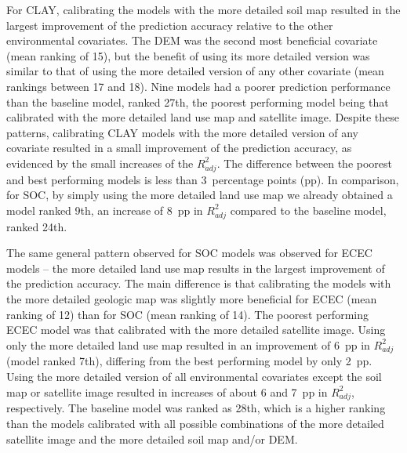 For CLAY, calibrating the models with the more detailed soil map resulted in the largest improvement of the 
prediction accuracy relative to the other environmental covariates. The DEM was the second most beneficial 
covariate (mean ranking of 15), but the benefit of using its more detailed version was similar to that of using 
the more detailed version of any other covariate (mean rankings between 17 and 18). Nine models had a poorer 
prediction performance than the baseline model, ranked 27th, the poorest performing model being that 
calibrated with the more detailed land use map and satellite image. Despite these patterns, calibrating CLAY 
models with the more detailed version of any covariate resulted in a small improvement of the prediction 
accuracy, as evidenced by the small increases of the ${R}^{2}_{adj}$. The difference between the poorest and 
best performing models is less than 3~percentage points (pp). In comparison, for SOC, by simply using the more 
detailed land use map we already obtained a model ranked 9th, an increase of 8~pp in ${R}^{2}_{adj}$ compared 
to the baseline model, ranked 24th.

The same general pattern observed for SOC models was observed for ECEC models -- the more detailed land use map 
results in the largest improvement of the prediction accuracy. The main difference is that calibrating the 
models with the more detailed geologic map was slightly more beneficial for ECEC (mean ranking of 12) than for 
SOC (mean ranking of 14). The poorest performing ECEC model was that calibrated with the more detailed 
satellite image. Using only the more detailed land use map resulted in an improvement of 6~pp in 
${R}^{2}_{adj}$ (model ranked 7th), differing from the best performing model by only 2~pp. Using the more 
detailed version of all environmental covariates except the soil map or satellite image resulted in increases 
of about 6 and 7~pp in ${R}^{2}_{adj}$, respectively. The baseline model was ranked as 28th, which is a higher 
ranking than the models calibrated with all possible combinations of the more detailed satellite image and the 
more detailed soil map and/or DEM.

